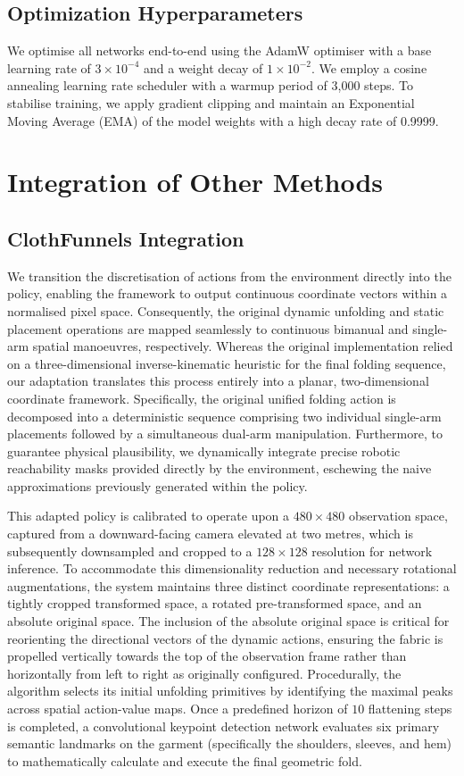 \documentclass[journal]{IEEEtran}
\begin{document}
\subsection{Optimization Hyperparameters}
We optimise all networks end-to-end using the AdamW optimiser with a base learning rate of $3 \times 10^{-4}$ and a weight decay of $1 \times 10^{-2}$. We employ a cosine annealing learning rate scheduler with a warmup period of 3,000 steps. To stabilise training, we apply gradient clipping and maintain an Exponential Moving Average (EMA) of the model weights with a high decay rate of 0.9999.


\section{Integration of Other Methods}
\subsection{ClothFunnels Integration}
We transition the discretisation of actions from the environment directly into the policy, enabling the framework to output continuous coordinate vectors within a normalised pixel space. Consequently, the original dynamic unfolding and static placement operations are mapped seamlessly to continuous bimanual and single-arm spatial manoeuvres, respectively. Whereas the original implementation relied on a three-dimensional inverse-kinematic heuristic for the final folding sequence, our adaptation translates this process entirely into a planar, two-dimensional coordinate framework. Specifically, the original unified folding action is decomposed into a deterministic sequence comprising two individual single-arm placements followed by a simultaneous dual-arm manipulation. Furthermore, to guarantee physical plausibility, we dynamically integrate precise robotic reachability masks provided directly by the environment, eschewing the naive approximations previously generated within the policy. 

This adapted policy is calibrated to operate upon a $480 \times 480$ observation space, captured from a downward-facing camera elevated at two metres, which is subsequently downsampled and cropped to a $128 \times 128$ resolution for network inference. To accommodate this dimensionality reduction and necessary rotational augmentations, the system maintains three distinct coordinate representations: a tightly cropped transformed space, a rotated pre-transformed space, and an absolute original space. The inclusion of the absolute original space is critical for reorienting the directional vectors of the dynamic actions, ensuring the fabric is propelled vertically towards the top of the observation frame rather than horizontally from left to right as originally configured. Procedurally, the algorithm selects its initial unfolding primitives by identifying the maximal peaks across spatial action-value maps. Once a predefined horizon of $10$ flattening steps is completed, a convolutional keypoint detection network evaluates six primary semantic landmarks on the garment (specifically the shoulders, sleeves, and hem) to mathematically calculate and execute the final geometric fold.
\end{document}
